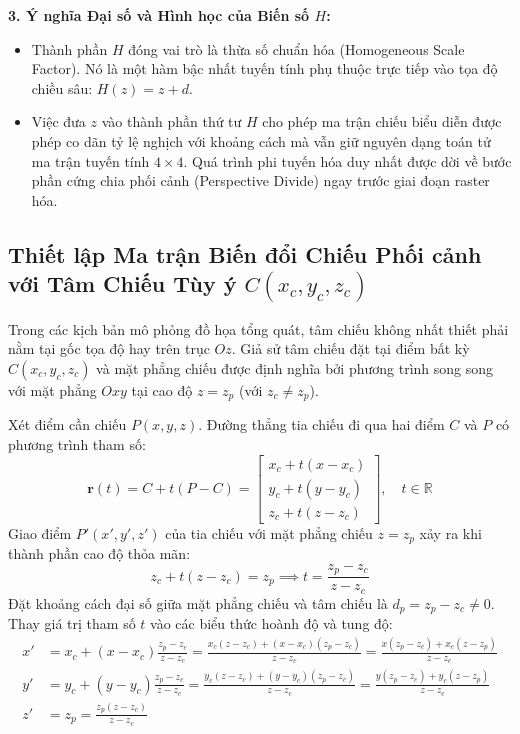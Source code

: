 \textbf{3. Ý nghĩa Đại số và Hình học của Biến số $H$:}
\begin{itemize}
    \item Thành phần $H$ đóng vai trò là thừa số chuẩn hóa (Homogeneous Scale Factor). Nó là một hàm bậc nhất tuyến tính phụ thuộc trực tiếp vào tọa độ chiều sâu: $H(z) = z + d$.
    \item Việc đưa $z$ vào thành phần thứ tư $H$ cho phép ma trận chiếu biểu diễn được phép co dãn tỷ lệ nghịch với khoảng cách mà vẫn giữ nguyên dạng toán tử ma trận tuyến tính $4 \times 4$. Quá trình phi tuyến hóa duy nhất được dời về bước phần cứng chia phối cảnh (Perspective Divide) ngay trước giai đoạn raster hóa.
\end{itemize}

\subsection{Thiết lập Ma trận Biến đổi Chiếu Phối cảnh với Tâm Chiếu Tùy ý \texorpdfstring{$C(x_c, y_c, z_c)$}{C(xc, yc, zc)}}
\label{subsec:perspective_matrix_arbitrary_cop}

Trong các kịch bản mô phỏng đồ họa tổng quát, tâm chiếu không nhất thiết phải nằm tại gốc tọa độ hay trên trục $Oz$. Giả sử tâm chiếu đặt tại điểm bất kỳ $C(x_c, y_c, z_c)$ và mặt phẳng chiếu được định nghĩa bởi phương trình song song với mặt phẳng $Oxy$ tại cao độ $z = z_p$ (với $z_c \neq z_p$).

Xét điểm cần chiếu $P(x, y, z)$. Đường thẳng tia chiếu đi qua hai điểm $C$ và $P$ có phương trình tham số:
\begin{equation}
\label{eq:arbitrary_ray_param}
\mathbf{r}(t) = C + t(P - C) = \begin{bmatrix}
x_c + t(x - x_c) \\
y_c + t(y - y_c) \\
z_c + t(z - z_c)
\end{bmatrix}, \quad t \in \mathbb{R}
\end{equation}
Giao điểm $P'(x', y', z')$ của tia chiếu với mặt phẳng chiếu $z = z_p$ xảy ra khi thành phần cao độ thỏa mãn:
\begin{equation}
z_c + t(z - z_c) = z_p \implies t = \frac{z_p - z_c}{z - z_c}
\end{equation}
Đặt khoảng cách đại số giữa mặt phẳng chiếu và tâm chiếu là $d_p = z_p - z_c \neq 0$. Thay giá trị tham số $t$ vào các biểu thức hoành độ và tung độ:
\begin{align}
x' &= x_c + (x - x_c) \frac{z_p - z_c}{z - z_c} = \frac{x_c(z - z_c) + (x - x_c)(z_p - z_c)}{z - z_c} = \frac{x(z_p - z_c) + x_c(z - z_p)}{z - z_c} \\
y' &= y_c + (y - y_c) \frac{z_p - z_c}{z - z_c} = \frac{y_c(z - z_c) + (y - y_c)(z_p - z_c)}{z - z_c} = \frac{y(z_p - z_c) + y_c(z - z_p)}{z - z_c} \\
z' &= z_p = \frac{z_p(z - z_c)}{z - z_c}
\end{align}

